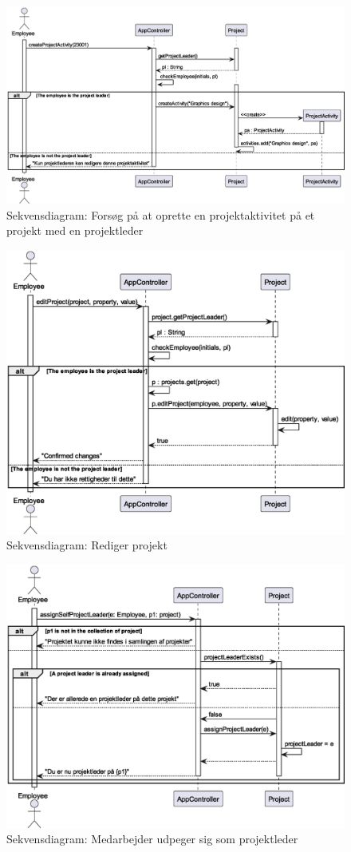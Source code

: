 \begin{figure}[H]
    \centering
    \caption{Sekvensdiagram: Forsøg på at oprette en projektaktivitet på et projekt med en projektleder}\label{fig:sequence_create_PA_PL}
    \includegraphics[width = .95\textwidth]{Diagrams/createActivityPL.eps}
\end{figure}
\begin{figure}[H]
    \centering
    \caption{Sekvensdiagram: Rediger projekt}\label{fig:sequence_project_edit}
    \includegraphics[width = .75\textwidth]{Diagrams/seq_project_edit.eps}
\end{figure}
\begin{figure}[H]
    \centering
    \caption{Sekvensdiagram: Medarbejder udpeger sig som projektleder}\label{fig:becomeProjectLeader}
    \includegraphics[width = 1\textwidth]{Diagrams/BecomeProjectLeader.eps}
\end{figure}
\newpage
